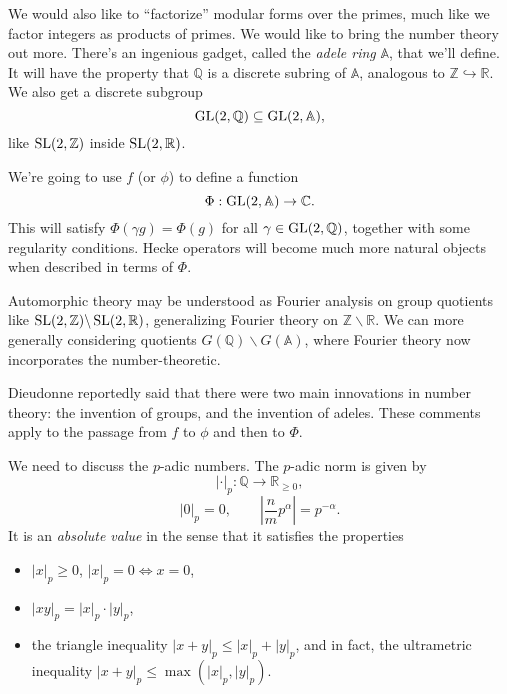 \documentclass[reqno]{amsart} 
\begin{document}
We would also like to ``factorize'' modular forms over the primes, much like we factor integers as products of primes.  We would like to bring the number theory out more.  There's an ingenious gadget, called the \emph{adele ring} $\mathbb{A}$, that we'll define.  It will have the property that $\mathbb{Q}$ is a discrete subring of $\mathbb{A}$, analogous to $\mathbb{Z} \hookrightarrow \mathbb{R}$.  We also get a discrete subgroup
\begin{equation*}
  \operatorname{GL}(2,\mathbb{Q}) \subseteq \operatorname{GL}(2, \mathbb{A}),
\end{equation*}
like $\operatorname{SL}(2, \mathbb{Z})$ inside $\operatorname{SL}(2, \mathbb{R})$.

We're going to use $f$ (or $\phi$) to define a function
\begin{equation*}
  \Phi : \operatorname{GL}(2,\mathbb{A}) \rightarrow \mathbb{C}.
\end{equation*}
This will satisfy $\Phi(\gamma g) = \Phi(g)$ for all $\gamma \in \operatorname{GL}(2, \mathbb{Q})$, together with some regularity conditions.  Hecke operators will become much more natural objects when described in terms of $\Phi$.

Automorphic theory may be understood as Fourier analysis on group quotients like $\operatorname{SL}(2, \mathbb{Z}) \backslash \operatorname{SL}(2, \mathbb{R})$, generalizing Fourier theory on $\mathbb{Z} \backslash \mathbb{R}$.  We can more generally considering quotients $G(\mathbb{Q}) \backslash G(\mathbb{A})$, where Fourier theory now incorporates the number-theoretic.

\begin{remark}
  Dieudonne reportedly said that there were two main innovations in number theory: the invention of groups, and the invention of adeles.  These comments apply to the passage from $f$ to $\phi$ and then to $\Phi$.
\end{remark}

We need to discuss the $p$-adic numbers.  The $p$-adic norm is given by
\begin{equation*}
  \lvert \cdot \rvert_p : \mathbb{Q} \rightarrow \mathbb{R}_{\geq 0},
\end{equation*}
\begin{equation*}
  \lvert 0 \rvert_p = 0, \qquad
  \left| \frac{n}{m} p^\alpha \right| = p^{- \alpha}.
\end{equation*}
It is an \emph{absolute value} in the sense that it satisfies the properties
\begin{itemize}
\item $\lvert x \rvert_p \geq 0$, $\lvert x \rvert_p = 0 \iff x = 0$,
\item $\lvert x y \rvert_p = \lvert x \rvert_p \cdot \lvert y \rvert_p$,
\item the triangle inequality $\lvert x + y \rvert_p \leq \lvert x \rvert_p + \lvert y \rvert_p$, and in fact, the ultrametric inequality $\lvert x + y \rvert_p \leq \max \left( \lvert x \rvert_p, \lvert y \rvert_p \right)$.
\end{itemize}
\end{document}
